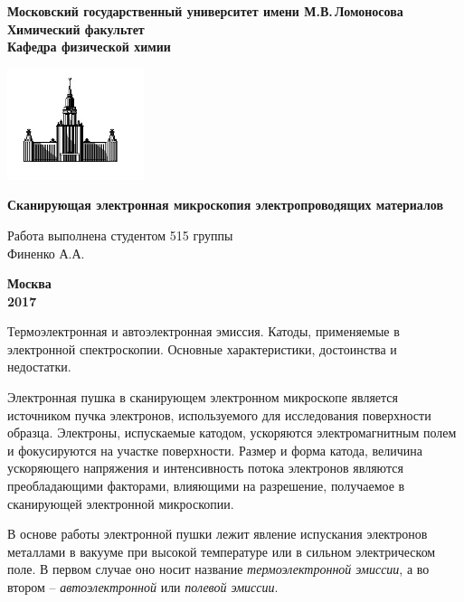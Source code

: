 \documentclass[12pt]{article}
\begin{document}
 

\begin{titlepage}
\centering
\textbf{\large Московский государственный университет имени М.В.\,Ломоносова\\
\vspace*{0.1cm} Химический факультет\\
\vspace*{0.1cm}
\noindent\makebox[\linewidth]{\rule{\paperwidth}{0.4pt}}
\vspace*{0.1cm}
 Кафедра физической химии}
\vspace*{2cm}

\begin{center}
\includegraphics[width=0.3\textwidth]{pictures/logo.jpg}
\end{center}

\vspace*{2cm}
\Large \textbf{Сканирующая электронная микроскопия электропроводящих материалов}
\vspace*{6cm}

\begin{flushright}
\large Работа выполнена студентом 515 группы\\
Финенко А.А.\\
\end{flushright}
\vfill
\large\textbf{Москва\\ 2017}
\end{titlepage}


Термоэлектронная и автоэлектронная эмиссия. Катоды, применяемые в электронной спектроскопии. Основные характеристики, достоинства и недостатки. \par
\vspace{1cm}

Электронная пушка в сканирующем электронном микроскопе является источником пучка электронов, используемого для исследования поверхности образца. Электроны, испускаемые катодом, ускоряются электромагнитным полем и фокусируются на участке поверхности. Размер и форма катода, величина ускоряющего напряжения и интенсивность потока электронов являются преобладающими факторами, влияющими на разрешение, получаемое в сканирующей электронной микроскопии. \par
В основе работы электронной пушки лежит явление испускания электронов металлами в вакууме при высокой температуре или в сильном электрическом поле. В первом случае оно носит название \textit{термоэлектронной эмиссии}, а во втором -- \textit{автоэлектронной} или \textit{полевой эмиссии}. \par
\end{document}
